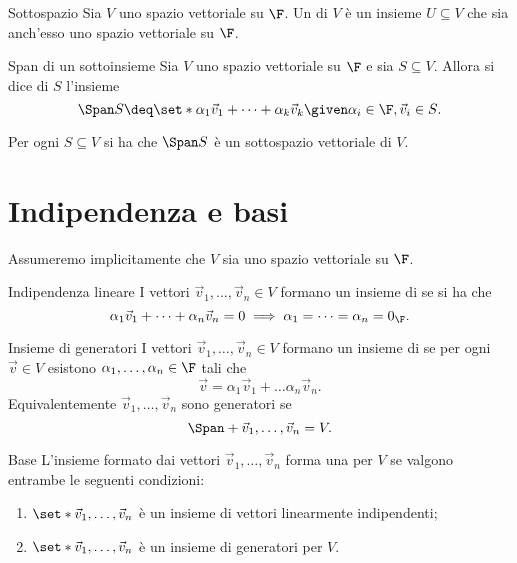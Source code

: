 \begin{definition}
    {Sottospazio}{}
    Sia $V$ uno spazio vettoriale su $\F$. Un  di $V$ è un insieme $U \subseteq V$ che sia anch'esso uno spazio vettoriale su $\F$. 
\end{definition}

\begin{definition}
    {Span di un sottoinsieme}{}
    Sia $V$ uno spazio vettoriale su $\F$ e sia $S \subseteq V$. Allora si dice  di $S$ l'insieme \[
        \Span S \deq \set*{\alpha_1 \vec v_1 + \dots + \alpha_k \vec v_k \given \alpha_i \in \F, \vec v_i \in S}.
    \]  
\end{definition}

\begin{proposition}{}{}
    Per ogni $S \subseteq V$ si ha che $\Span S$ è un sottospazio vettoriale di $V$.
\end{proposition}

\section{Indipendenza e basi}

Assumeremo implicitamente che $V$ sia uno spazio vettoriale su $\F$.

\begin{definition}
    {Indipendenza lineare}{}
    I vettori $\vec v_1, \dots, \vec v_n \in V$ formano un insieme di  se si ha che \[
        \alpha_1\vec v_1 + \dots + \alpha_n\vec v_n = 0 \implies \alpha_1 = \dots = \alpha_n = 0_{\F}.
    \]
\end{definition}

\begin{definition}
    {Insieme di generatori}{}
    I vettori $\vec v_1, \dots, \vec v_n \in V$ formano un insieme di  se per ogni $\vec v \in V$ esistono $\alpha_1, \dots, \alpha_n \in \F$ tali che \[
        \vec v = \alpha_1 \vec v_1 + \dots \alpha_n\vec v_n.
    \] Equivalentemente $\vec v_1, \dots, \vec v_n$ sono generatori se \[
        \Span+{\vec v_1, \dots, \vec v_n} = V.
    \] 
\end{definition}

\begin{definition}
    {Base}{}
    L'insieme formato dai vettori $\vec v_1, \dots, \vec v_n$ forma una  per $V$ se valgono entrambe le seguenti condizioni:
    \begin{enumerate}
        \item $\set*{\vec v_1, \dots, \vec v_n}$ è un insieme di vettori linearmente indipendenti;
        \item $\set*{\vec v_1, \dots, \vec v_n}$ è un insieme di generatori per $V$.
    \end{enumerate}
\end{definition}

